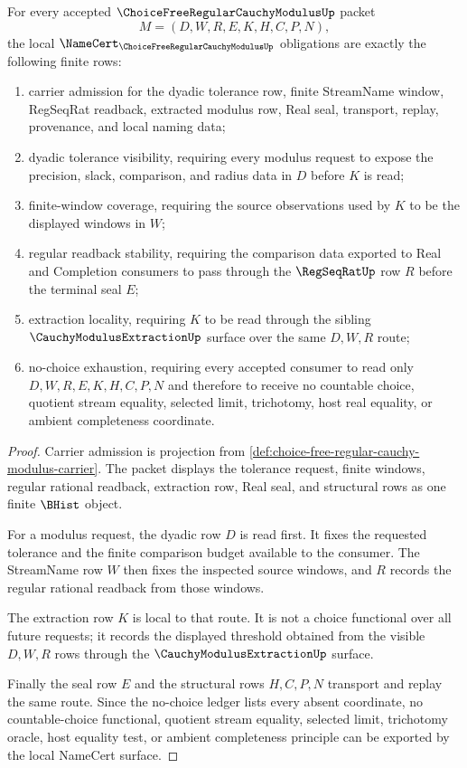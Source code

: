 \begin{theorem}
\label{thm:choice-free-regular-cauchy-modulus-obligations}
For every accepted $\ChoiceFreeRegularCauchyModulusUp$ packet
$$
M=(D,W,R,E,K,H,C,P,N),
$$
the local $\NameCert_{\ChoiceFreeRegularCauchyModulusUp}$ obligations are exactly the following finite rows:
\begin{enumerate}
\item carrier admission for the dyadic tolerance row, finite StreamName window, RegSeqRat readback, extracted modulus row, Real seal, transport, replay, provenance, and local naming data;
\item dyadic tolerance visibility, requiring every modulus request to expose the precision, slack, comparison, and radius data in $D$ before $K$ is read;
\item finite-window coverage, requiring the source observations used by $K$ to be the displayed windows in $W$;
\item regular readback stability, requiring the comparison data exported to Real and Completion consumers to pass through the $\RegSeqRatUp$ row $R$ before the terminal seal $E$;
\item extraction locality, requiring $K$ to be read through the sibling $\CauchyModulusExtractionUp$ surface over the same $D,W,R$ route;
\item no-choice exhaustion, requiring every accepted consumer to read only $D,W,R,E,K,H,C,P,N$ and therefore to receive no countable choice, quotient stream equality, selected limit, trichotomy, host real equality, or ambient completeness coordinate.
\end{enumerate}
\end{theorem}
\begin{proof}
Carrier admission is projection from \autoref{def:choice-free-regular-cauchy-modulus-carrier}. The packet displays the tolerance request, finite windows, regular rational readback, extraction row, Real seal, and structural rows as one finite $\BHist$ object.

For a modulus request, the dyadic row $D$ is read first. It fixes the requested tolerance and the finite comparison budget available to the consumer. The StreamName row $W$ then fixes the inspected source windows, and $R$ records the regular rational readback from those windows.

The extraction row $K$ is local to that route. It is not a choice functional over all future requests; it records the displayed threshold obtained from the visible $D,W,R$ rows through the $\CauchyModulusExtractionUp$ surface.

Finally the seal row $E$ and the structural rows $H,C,P,N$ transport and replay the same route. Since the no-choice ledger lists every absent coordinate, no countable-choice functional, quotient stream equality, selected limit, trichotomy oracle, host equality test, or ambient completeness principle can be exported by the local NameCert surface.
\end{proof}

